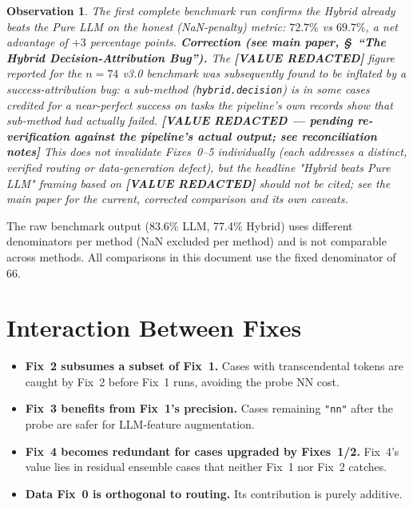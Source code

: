 \documentclass[twoside,11pt]{article}
\newtheorem{observation}{Observation}
\begin{document}
\begin{observation}
The first complete benchmark run confirms the Hybrid already
\emph{beats} the Pure LLM on the honest (NaN-penalty) metric:
$72.7\%$ vs $69.7\%$, a net advantage of $+3$ percentage points.
\textbf{Correction (see main paper, \S~``The Hybrid Decision-Attribution
Bug'').} The \textbf{[VALUE REDACTED]} figure reported for the $n=74$ v3.0 benchmark was
subsequently found to be inflated by a success-attribution bug: a
sub-method (\texttt{hybrid.decision}) is in some cases credited for a
near-perfect success on tasks the pipeline's own records show that
sub-method had actually failed. \textbf{[VALUE REDACTED --- pending re-verification against the pipeline's actual output; see reconciliation notes]} This does not
invalidate Fixes~0--5 individually (each addresses a distinct, verified
routing or data-generation defect), but the headline "Hybrid beats Pure
LLM" framing based on \textbf{[VALUE REDACTED]} should not be cited; see the main
paper for the current, corrected comparison and its own caveats.
\end{observation}

\begin{remark}
The raw benchmark output (83.6\% LLM, 77.4\% Hybrid) uses different
denominators per method (NaN excluded per method) and is not comparable
across methods.  All comparisons in this document use the fixed denominator
of 66.
\end{remark}

\section{Interaction Between Fixes}
\label{sec:interactions}

\begin{itemize}[leftmargin=*]
  \item \textbf{Fix~2 subsumes a subset of Fix~1.}  Cases with transcendental
    tokens are caught by Fix~2 before Fix~1 runs, avoiding the probe NN cost.
  \item \textbf{Fix~3 benefits from Fix~1's precision.}  Cases remaining
    \texttt{"nn"} after the probe are safer for LLM-feature augmentation.
  \item \textbf{Fix~4 becomes redundant for cases upgraded by Fixes~1/2.}
    Fix~4's value lies in residual ensemble cases that neither Fix~1 nor
    Fix~2 catches.
  \item \textbf{Data Fix~0 is orthogonal to routing.}  Its contribution
    is purely additive.
\end{itemize}
\end{document}
